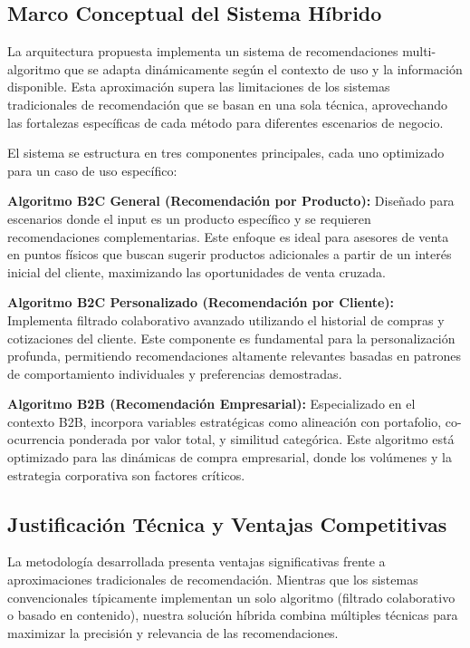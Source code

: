 \documentclass[twocolumn]{article}
\begin{document}
\subsection{Marco Conceptual del Sistema Híbrido}

La arquitectura propuesta implementa un sistema de recomendaciones multi-algoritmo que se adapta dinámicamente según el contexto de uso y la información disponible. Esta aproximación supera las limitaciones de los sistemas tradicionales de recomendación que se basan en una sola técnica, aprovechando las fortalezas específicas de cada método para diferentes escenarios de negocio.

El sistema se estructura en tres componentes principales, cada uno optimizado para un caso de uso específico:

\textbf{Algoritmo B2C General (Recomendación por Producto):} Diseñado para escenarios donde el input es un producto específico y se requieren recomendaciones complementarias. Este enfoque es ideal para asesores de venta en puntos físicos que buscan sugerir productos adicionales a partir de un interés inicial del cliente, maximizando las oportunidades de venta cruzada.

\textbf{Algoritmo B2C Personalizado (Recomendación por Cliente):} Implementa filtrado colaborativo avanzado utilizando el historial de compras y cotizaciones del cliente. Este componente es fundamental para la personalización profunda, permitiendo recomendaciones altamente relevantes basadas en patrones de comportamiento individuales y preferencias demostradas.

\textbf{Algoritmo B2B (Recomendación Empresarial):} Especializado en el contexto B2B, incorpora variables estratégicas como alineación con portafolio, co-ocurrencia ponderada por valor total, y similitud categórica. Este algoritmo está optimizado para las dinámicas de compra empresarial, donde los volúmenes y la estrategia corporativa son factores críticos.

\subsection{Justificación Técnica y Ventajas Competitivas}

La metodología desarrollada presenta ventajas significativas frente a aproximaciones tradicionales de recomendación. Mientras que los sistemas convencionales típicamente implementan un solo algoritmo (filtrado colaborativo o basado en contenido), nuestra solución híbrida combina múltiples técnicas para maximizar la precisión y relevancia de las recomendaciones.
\end{document}
